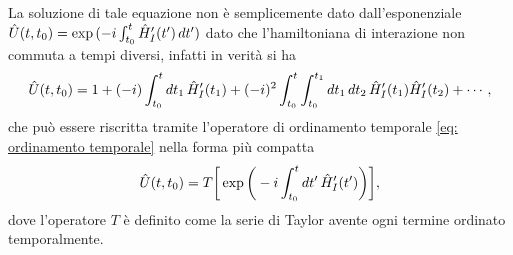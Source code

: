 La soluzione di tale equazione non è semplicemente dato dall'esponenziale $\hat{U}(t,t_0) = \exp{(-i\int_{t_0}^t\hat{H}_I'(t')\,dt')}$ dato che l'hamiltoniana di interazione non commuta a tempi diversi, infatti in verità si ha
\begin{equation}
    \hat{U}(t,t_0) = 1 + (-i)\int_{t_0}^tdt_1\,\hat{H}_I'(t_1) + (-i)^2 \int_{t_0}^t\int_{t_0}^{t_1}dt_1\,dt_2\,\hat{H}_I'(t_1)\hat{H}_I'(t_2) + \cdots,
\end{equation}
che può essere riscritta tramite l'operatore di ordinamento temporale \eqref{eq: ordinamento temporale} nella forma più compatta
\begin{equation}
    \hat{U}(t,t_0) = T\bigg[\exp{\bigg(-i\int_{t_0}^tdt'\,\hat{H}'_I(t')\bigg)}\bigg],
\end{equation}
dove l'operatore $T$ è definito come la serie di Taylor avente ogni termine ordinato temporalmente. 

